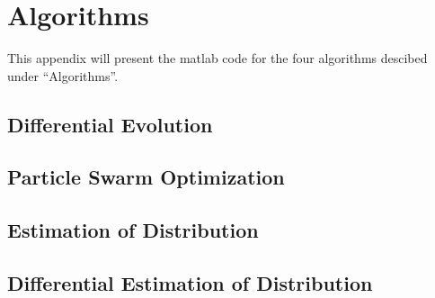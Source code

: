 \section{Algorithms}

This appendix will present the matlab code for the four algorithms descibed under ``Algorithms''.

\subsection{Differential Evolution}



\subsection{Particle Swarm Optimization}



\subsection{Estimation of Distribution}



\subsection{Differential Estimation of Distribution}


